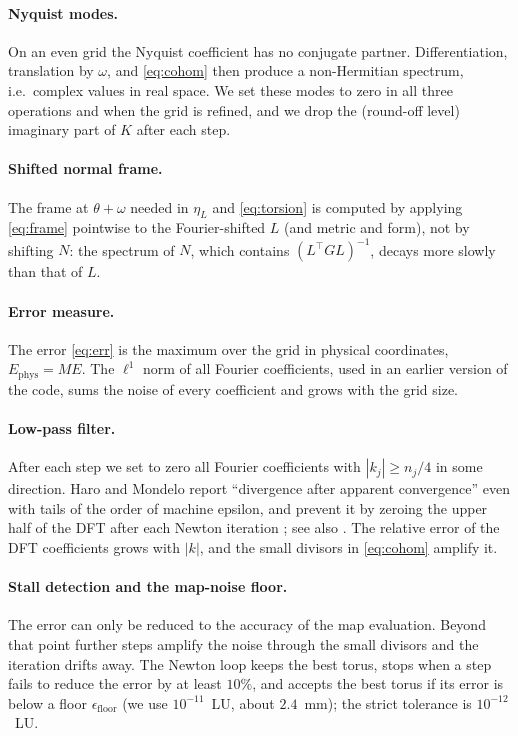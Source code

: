 \documentclass[11pt]{article}
\begin{document}
\paragraph{Nyquist modes.} On an even grid the Nyquist coefficient has no conjugate partner.
Differentiation, translation by $\omega$, and \eqref{eq:cohom} then produce a non-Hermitian
spectrum, i.e.\ complex values in real space. We set these modes to zero in all three operations
and when the grid is refined, and we drop the (round-off level) imaginary part of $K$ after each
step.

\paragraph{Shifted normal frame.} The frame at $\theta+\omega$ needed in $\eta_L$ and
\eqref{eq:torsion} is computed by applying \eqref{eq:frame} pointwise to the Fourier-shifted $L$
(and metric and form), not by shifting $N$: the spectrum of $N$, which contains
$(L^\top G L)^{-1}$, decays more slowly than that of $L$.

\paragraph{Error measure.} The error \eqref{eq:err} is the maximum over the grid in physical
coordinates, $E_{\mathrm{phys}} = M E$. The $\ell^1$ norm of all Fourier coefficients, used in an
earlier version of the code, sums the noise of every coefficient and grows with the grid size.

\paragraph{Low-pass filter.} After each step we set to zero all Fourier coefficients with
$|k_j|\ge n_j/4$ in some direction. Haro and Mondelo report ``divergence after apparent
convergence'' even with tails of the order of machine epsilon, and prevent it by zeroing the upper
half of the DFT after each Newton iteration \cite[pp.~27--28]{haromondelo2021flow}; see also
\cite{kumar2022whiskered}. The relative error of the DFT coefficients grows with $|k|$, and the
small divisors in \eqref{eq:cohom} amplify it.

\paragraph{Stall detection and the map-noise floor.} The error can only be reduced to the
accuracy of the map evaluation. Beyond that point further steps amplify the noise through the
small divisors and the iteration drifts away. The Newton loop keeps the best torus, stops when a
step fails to reduce the error by at least $10\%$, and accepts the best torus if its error is below
a floor $\epsilon_{\mathrm{floor}}$ (we use $10^{-11}$~LU, about $2.4$~mm); the strict tolerance
is $10^{-12}$~LU.
\end{document}
